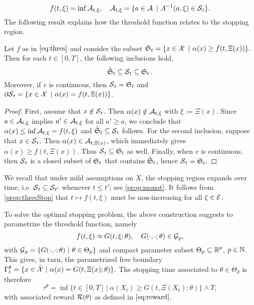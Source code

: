 \begin{equation}\label{eq:thres}
   f(t,\xi) =
\inf \operatorname{\mathcal{A}}_{t,\xi}, \quad \operatorname{\mathcal{A}}_{t,\xi} = \{a \in \operatorname{\mathcal{A}} \ | \  A^{-1}(a,\xi)\in \operatorname{\mathcal{S}}_t\}. 
\end{equation}
The following result explains how the threshold function relates to the stopping region. 
\begin{proposition}\label{prop:thresStop}
Let $f$ as in $\eqref{eq:thres}$ and consider the subset $\frakS_t = \{x\in \calX \ | \ \alpha(x)  \ge f(t,\Xi(x)) \}.$
Then  for each $t\in [0,T]$, the following inclusions hold,
$$\mathring{\operatorname{\mathfrak{S}}}_t \subseteq \operatorname{\mathcal{S}}_t  \subseteq \operatorname{\mathfrak{S}}_t. $$ 
Moreover, if  $v$ is continuous, then $\operatorname{\mathcal{S}}_t = \operatorname{\mathfrak{S}}_t$ and 
$\partial \! \operatorname{\mathcal{S}}_t = \{x\in \operatorname{\mathcal{X}} \ | \ \alpha(x) = f(t,\Xi(x))\}$.
\end{proposition}
\begin{proof}
 First, assume that $x \notin \operatorname{\mathcal{S}}_t$. Then $\alpha(x) \notin \operatorname{\mathcal{A}}_{t,\xi}$ with $\xi := \Xi(x)$. Since $a\in \operatorname{\mathcal{A}}_{t,\xi}$ implies  $a'\in \operatorname{\mathcal{A}}_{t,\xi}$ for all $a' \ge a$, we conclude that  $\alpha(x) \le  \inf \operatorname{\mathcal{A}}_{t,\xi} = f(t,\xi)$ and
 $\mathring{\operatorname{\mathfrak{S}}}_t \subseteq \operatorname{\mathcal{S}}_t$ follows. For the second inclusion, suppose that $x\in \operatorname{\mathcal{S}}_t$. Then $\alpha(x) \in \operatorname{\mathcal{A}}_{t,\Xi(x)}$,  which immediately gives $\alpha(x) \ge f(t,\Xi(x))$. Thus $\operatorname{\mathcal{S}}_t \subseteq \operatorname{\mathfrak{S}}_t$ as well. Finally, when $v$ is continuous, then $\operatorname{\mathcal{S}}_t$ is a closed subset of $\operatorname{\mathfrak{S}}_t$ that contains $\mathring{\operatorname{\mathfrak{S}}}_t$, hence $\operatorname{\mathcal{S}}_t = \operatorname{\mathfrak{S}}_t$.
\end{proof}

We recall that under mild assumptions on $X$,  %
the stopping region expands over time, i.e. $\operatorname{\mathcal{S}}_t \subseteq \operatorname{\mathcal{S}}_{t'}$ whenever $t\le t'$; see \cref{prop:monot}. 
It follows from \cref{prop:thresStop}  that   $t\mapsto f(t,\xi)$ must be non-increasing for all $\xi\in \operatorname{\mathcal{E}}$.

To solve the optimal stopping problem, the above construction suggests to parametrize the threshold function, namely 
\begin{equation}
    f(t,\xi) \approx G(t,\xi; \theta), \quad G(\cdot,\cdot; \theta) \in \operatorname{\mathcal{G}}_p, 
\end{equation}
with $\operatorname{\mathcal{G}}_p = \{G(\cdot,\cdot; \theta) \ | \ \theta \in \Theta_p \}$ and compact parameter subset $\Theta_p \subseteq \operatorname{\mathbb{R}}^p$, $p\in \operatorname{\mathbb{N}}$. This gives, in turn, the parametrized free boundary 
$\Gamma_t^{\theta} = \{x \in \mathring{\operatorname{\mathcal{X}}} \ | \ \alpha(x) = G(t,\Xi(x); \theta)\}. $ 
The stopping time associated to $\theta \in \Theta_d$ is therefore
\begin{equation}\label{eq:stopTime}
    \tau^{\theta} = \inf\{t \in [0,T] \ | \ \alpha(X_t) \ge G(t,\Xi(X_t); \theta) \} \wedge T,
\end{equation}
with associated reward  $\operatorname{\mathcal{R}}(\theta)$ as defined  in $\eqref{eq:reward}$.

